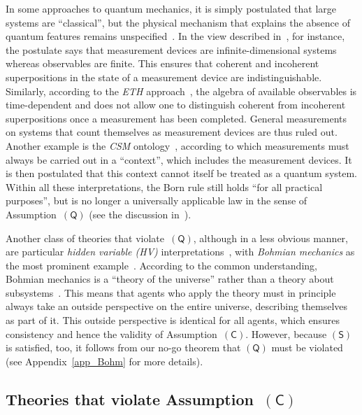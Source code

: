 \documentclass{article}
\theoremstyle{mystyle}
\theoremstyle{definition}
\newcommand*{\QT}{\mathsf{(Q)}}
\newcommand*{\SW}{\mathsf{(S)}}
\newcommand*{\SelfCons}{\mathsf{(C)}}
\begin{document}
In some approaches to quantum mechanics, it is simply postulated that large systems are ``classical'', but the physical mechanism that explains the absence of quantum features remains unspecified~\cite{LanLif13}. In the view described in~\cite{Hepp72}, for instance, the postulate says that measurement devices are infinite-dimensional systems whereas observables are finite. This ensures that coherent and incoherent superpositions in the state of a measurement device are indistinguishable. Similarly, according to the  \emph{ETH} approach~\cite{FroSch15}, the algebra of available observables is time-dependent and does not allow one to distinguish coherent from incoherent superpositions once a measurement has been completed. General measurements on systems that count themselves as measurement devices are thus ruled out.  Another example is the \emph{CSM} ontology~\cite{AufGra15}, according to which measurements must always be carried out in a ``context'', which includes the measurement devices. It is then postulated that this context cannot itself be treated as a quantum system. Within all these interpretations, the Born rule still holds ``for all practical purposes'', but is no longer a universally applicable law in the sense of Assumption~$\QT$ (see the discussion in~\cite{Bell75}).

Another class of theories that violate~$\QT$, although in a less obvious manner, are particular \emph{hidden variable (HV)} interpretations~\cite{Neuman32}, with \emph{Bohmian mechanics} as the most prominent example~\cite{deBroglie27,Bohm52,DuTe09}. According to the common understanding, Bohmian mechanics is a ``theory of the universe'' rather than a theory about subsystems~\cite{DuGoZa92}. This means that agents who apply the theory must in principle always take an  outside perspective on the entire universe, describing themselves as part of it. This outside perspective is identical for all agents,  which ensures consistency and hence the validity of Assumption~$\SelfCons$. However, because $\SW$ is satisfied, too, it follows from our no-go theorem that $\QT$ must be violated (see Appendix~\ref{app_Bohm} for more details).   

\smallskip

\subsection{Theories that violate Assumption~$\SelfCons$} \label{sec_Cviolation}
\end{document}
